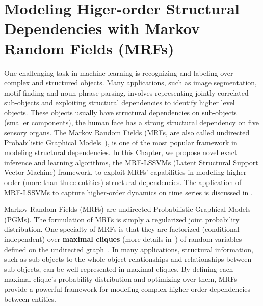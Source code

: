 
\chapter{Modeling Higer-order Structural Dependencies with Markov Random Fields (MRFs)}
\label{cha:mrf}

One challenging task in machine learning is recognizing and
labeling over complex and structured objects. Many applications,
such as image segmentation, motif finding and noun-phrase
parsing, involves representing jointly correlated sub-objects and
exploiting structural dependencies to identify higher level
objects. These objects usually have structural dependencies on
sub-objects (smaller components), \eg the human face has a strong
structural dependency on five sensory organs. The Markov Random
Fields (MRFs, are also called undirected Probabilistic Graphical
Models~\cite{bishop:2006:PRML}), is one of the most popular
framework in modeling structural dependencies. In this Chapter,
we propose novel exact inference and learning algorithms, the
MRF-LSSVMs (Latent Structural Support Vector Machine) framework,
to exploit MRFs' capabilities in modeling higher-order (more than
three entities) structural dependencies. The application of
MRF-LSSVMs to capture higher-order dynamics on time series is
discussed in .

Markov Random Fields (MRFs) are undirected Probabilistic
Graphical Models (PGMs). The formulation of MRFs is simply a
regularized joint probability distribution. One specialty of MRFs
is that they are factorized (conditional independent) over
\textbf{maximal cliques} (more details in~) of
random variables defined on the undirected
graph~\cite{bishop:2006:PRML}. In many applications, structural
information, such as sub-objects to the whole object
relationships and relationships between sub-objects, can be well
represented in maximal cliques. By defining each maximal clique's
probability distribution and optimizing over them, MRFs provide a
powerful framework for modeling complex higher-order
dependencies between entities.

